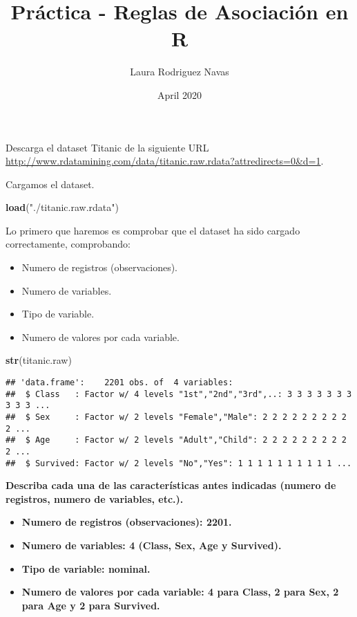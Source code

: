 \documentclass[]{article}
\title{Práctica - Reglas de Asociación en R}
\author{Laura Rodriguez Navas}
\date{April 2020}
\newenvironment{Shaded}{\begin{snugshade}}{\end{snugshade}}
\newcommand{\KeywordTok}[1]{\textcolor[rgb]{0.13,0.29,0.53}{\textbf{#1}}}
\newcommand{\NormalTok}[1]{#1}
\newcommand{\StringTok}[1]{\textcolor[rgb]{0.31,0.60,0.02}{#1}}
\providecommand{\tightlist}{%
  \setlength{\itemsep}{0pt}\setlength{\parskip}{0pt}}
\begin{document}
\maketitle

Descarga el dataset Titanic de la siguiente URL
\url{http://www.rdatamining.com/data/titanic.raw.rdata?attredirects=0\&d=1}.

Cargamos el dataset.

\begin{Shaded}
\begin{Highlighting}[]
\KeywordTok{load}\NormalTok{(}\StringTok{"./titanic.raw.rdata"}\NormalTok{)}
\end{Highlighting}
\end{Shaded}

Lo primero que haremos es comprobar que el dataset ha sido cargado
correctamente, comprobando:

\begin{itemize}
\tightlist
\item
  Numero de registros (observaciones).
\item
  Numero de variables.
\item
  Tipo de variable.
\item
  Numero de valores por cada variable.
\end{itemize}

\begin{Shaded}
\begin{Highlighting}[]
\KeywordTok{str}\NormalTok{(titanic.raw)}
\end{Highlighting}
\end{Shaded}

\begin{verbatim}
## 'data.frame':    2201 obs. of  4 variables:
##  $ Class   : Factor w/ 4 levels "1st","2nd","3rd",..: 3 3 3 3 3 3 3 3 3 3 ...
##  $ Sex     : Factor w/ 2 levels "Female","Male": 2 2 2 2 2 2 2 2 2 2 ...
##  $ Age     : Factor w/ 2 levels "Adult","Child": 2 2 2 2 2 2 2 2 2 2 ...
##  $ Survived: Factor w/ 2 levels "No","Yes": 1 1 1 1 1 1 1 1 1 1 ...
\end{verbatim}

\textbf{Describa cada una de las características antes indicadas (numero
de registros, numero de variables, etc.).}

\begin{itemize}
\tightlist
\item
  \textbf{Numero de registros (observaciones): 2201.}
\item
  \textbf{Numero de variables: 4 (Class, Sex, Age y Survived).}
\item
  \textbf{Tipo de variable: nominal.}
\item
  \textbf{Numero de valores por cada variable: 4 para Class, 2 para Sex,
  2 para Age y 2 para Survived.}
\end{itemize}
\end{document}
